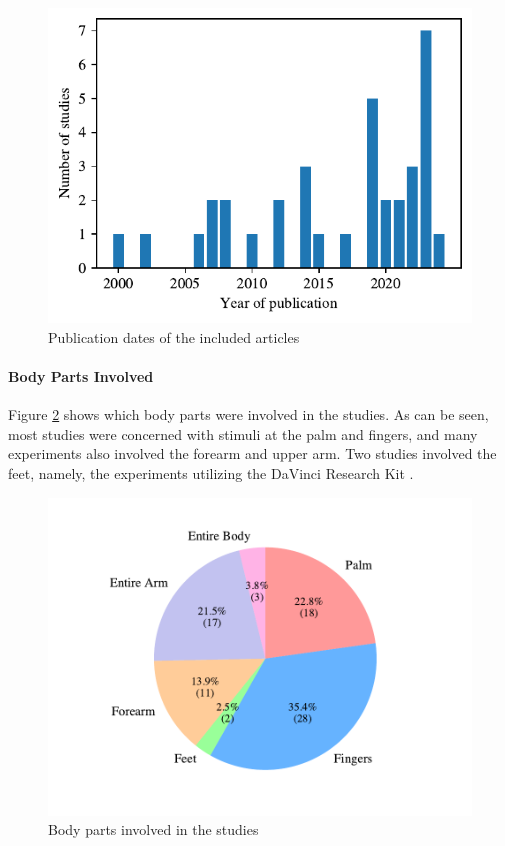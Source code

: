 \begin{figure}[htbp]
    \centering
    \includegraphics[width=\columnwidth]{figures/years.pdf} 
    \caption{Publication dates of the included articles}
    \label{fig:years}
\end{figure} 


\paragraph{Body Parts Involved}

Figure \ref{fig:body_parts_pie} shows which body parts were involved in the studies. As can be seen, most studies were concerned with stimuli at the palm and fingers, and many experiments also involved the forearm and upper arm. Two studies involved the feet, namely, the experiments utilizing the DaVinci Research Kit \cite{Caccianiga2021, Oquendo2024}.

\begin{figure}[htbp]
    \centering
    \includegraphics[width=\columnwidth]{figures/body_pie.pdf} 
    \caption{Body parts involved in the studies}
    \label{fig:body_parts_pie}
\end{figure} 

